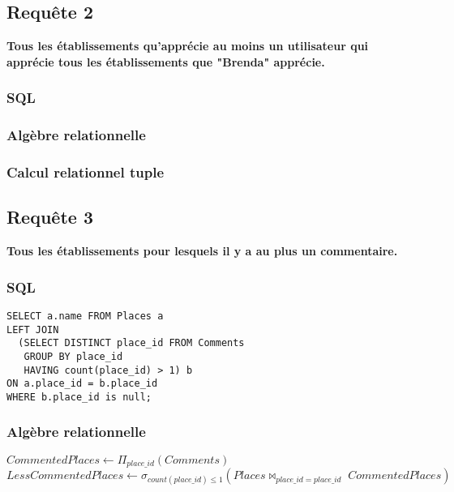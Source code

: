 \documentclass[a4paper,10pt]{article}
\begin{document}
\newpage

\subsection{Requête 2}

\textbf{Tous les établissements qu’apprécie au moins un utilisateur qui apprécie tous les établissements que "Brenda" apprécie.}

\subsubsection{SQL}

\subsubsection{Algèbre relationnelle}

\subsubsection{Calcul relationnel tuple}

\newpage

\subsection{Requête 3}

\textbf{Tous les établissements pour lesquels il y a au plus un commentaire.}

\subsubsection{SQL}

\begin{verbatim}
SELECT a.name FROM Places a 
LEFT JOIN
  (SELECT DISTINCT place_id FROM Comments 
   GROUP BY place_id 
   HAVING count(place_id) > 1) b 
ON a.place_id = b.place_id 
WHERE b.place_id is null;
\end{verbatim}

\subsubsection{Algèbre relationnelle}


$ CommentedPlaces \leftarrow \Pi_{place\_id} (Comments) $ \\

$ LessCommentedPlaces \leftarrow \sigma_{count(place\_id) \leq 1} (Places \bowtie_{place\_id = place\_id} \; CommentedPlaces)$ \\
\end{document}
